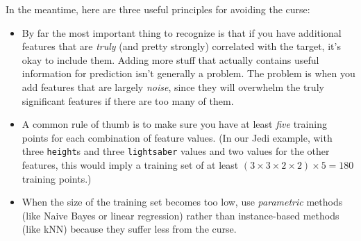 \documentclass[12pt]{article}
\begin{document}
\vspace{.1in}
In the meantime, here are three useful principles for avoiding the curse:

\begin{itemize}
\itemsep.1em
\item By far the most important thing to recognize is that if you have
additional features that are \textit{truly} (and pretty strongly) correlated
with the target, it's okay to include them. Adding more stuff that actually
contains useful information for prediction isn't generally a problem. The
problem is when you add features that are largely \textit{noise}, since
they will overwhelm the truly significant features if there are too many of
them.
\item A common rule of thumb is to make sure you have at least \textit{five}
training points for each combination of feature values. (In our Jedi example,
with three \texttt{height}s and three \texttt{lightsaber} values and two
values for the other features, this would imply a training set of at least $(3
\times 3 \times 2 \times 2) \times 5 = 180$ training points.)
\item When the size of the training set becomes too low, use
\textit{parametric} methods (like Naive Bayes or linear regression) rather
than instance-based methods (like kNN) because they suffer less from the
curse.
\end{itemize}
\end{document}
